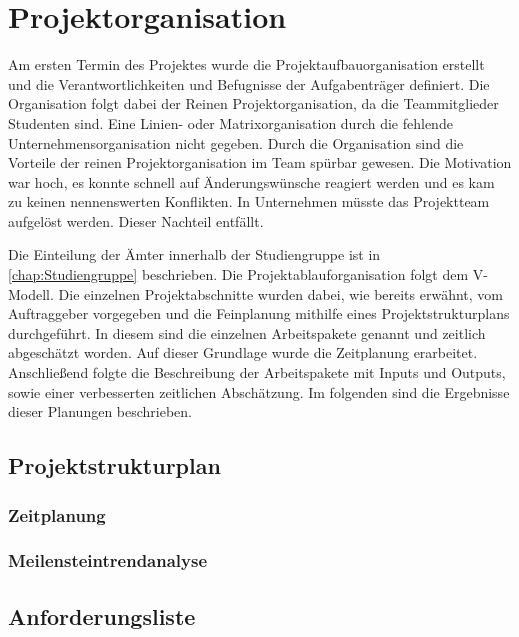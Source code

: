 \chapter{Projektorganisation}
Am ersten Termin des Projektes wurde die Projektaufbauorganisation erstellt und die Verantwortlichkeiten und Befugnisse der Aufgabenträger definiert. Die Organisation folgt dabei der Reinen Projektorganisation, da die Teammitglieder Studenten sind. Eine Linien- oder Matrixorganisation durch die fehlende Unternehmensorganisation nicht gegeben. Durch die Organisation sind die Vorteile der reinen Projektorganisation im Team spürbar gewesen. Die Motivation war hoch, es konnte schnell auf Änderungswünsche reagiert werden und es kam zu keinen nennenswerten Konflikten. In Unternehmen müsste das Projektteam aufgelöst werden. Dieser Nachteil entfällt. 

Die Einteilung der Ämter innerhalb der Studiengruppe ist in \autoref{chap:Studiengruppe} beschrieben. Die Projektablauforganisation folgt dem V-Modell. Die einzelnen Projektabschnitte wurden dabei, wie bereits erwähnt, vom Auftraggeber vorgegeben und die Feinplanung mithilfe eines Projektstrukturplans durchgeführt. In diesem sind die einzelnen Arbeitspakete genannt und zeitlich abgeschätzt worden. Auf dieser Grundlage wurde die Zeitplanung erarbeitet. Anschließend folgte die Beschreibung der Arbeitspakete mit Inputs und Outputs, sowie einer verbesserten zeitlichen Abschätzung. Im folgenden sind die Ergebnisse dieser Planungen beschrieben.
\section{Projektstrukturplan}
\subsection{Zeitplanung}
\subsection{Meilensteintrendanalyse}
\section{Anforderungsliste}